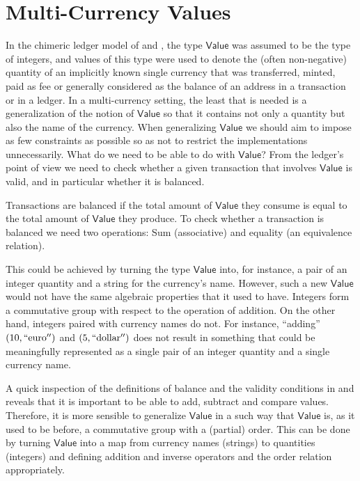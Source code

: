 \documentclass{llncs}
\newcommand{\type}[1]{\mathsf{#1}}
\newcommand{\valueT}{\type{Value}}
\begin{document}
\section{Multi-Currency Values}
\label{sec:MultiCurrencyValues}

In the chimeric ledger model of \cite{ChimericLedgers} and \cite{UTxOScripts}, the type $\valueT$ was assumed to be the type of integers, and values of this type were used to denote the (often non-negative) quantity of an implicitly known single currency that was transferred, minted, paid as fee or generally considered as the balance of an address in a transaction or in a ledger. In a multi-currency setting, the least that is needed is a generalization of the notion of $\valueT$ so that it contains not only a quantity but also the name of the currency. When generalizing $\valueT$ we should aim to impose as few constraints as possible so as not to restrict the implementations unnecessarily. What do we need to be able to do with $\valueT$? From the ledger's point of view we need to check whether a given transaction that involves $\valueT$ is valid, and in particular whether it is balanced.

Transactions are balanced if the total amount of $\valueT$ they consume is equal to the total amount of $\valueT$ they produce. To check whether a transaction is balanced we need two operations: Sum (associative) and equality (an equivalence relation).

\begin{figure}
\end{figure}


This could be achieved by turning the type $\valueT$ into, for instance, a pair of an integer quantity and a string for the currency's name. However, such a new $\valueT$ would not have the same algebraic properties that it used to have. Integers form a commutative group with respect to the operation of addition. On the other hand, integers paired with currency names do not. For instance, ``adding'' $(10, \mathrm{``euro''})$ and $(5, \mathrm{``dollar''})$ does not result in something that could be meaningfully represented as a single pair of an integer quantity and a single currency name.

A quick inspection of the definitions of balance and the validity conditions in \cite{ChimericLedgers} and \cite{UTxOScripts} reveals that it is important to be able to add, subtract and compare values. Therefore, it is more sensible to generalize $\valueT$ in a such way that $\valueT$ is, as it used to be before, a commutative group with a (partial) order. This can be done by turning $\valueT$ into a map from currency names (strings) to quantities (integers) and defining addition and inverse operators and the order relation appropriately.
\end{document}
